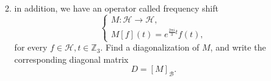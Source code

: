\documentclass{article}
\def\zz{{\mathbb Z}}
\begin{document}
\begin{problem}
\begin{enumerate}[(a)]
\begin{enumerate}[1.]
\begin{equation*}
            \end{equation*}
            \item in addition, we have an operator called frequency shift
            \begin{equation*}
                \begin{cases}
                    M : \mathscr{H} \to \mathscr{H}, \\
                    M[f](t) = e^{\frac{2 \pi i}{3} t} f(t),
                \end{cases}
            \end{equation*}
            for every $f \in \mathscr{H}, t \in \zz_3$. Find a diagonalization of $M$, and write the corresponding diagonal matrix
            \begin{equation*}
                D = [M]_{\mathscr{B}}.
            \end{equation*}
        \end{enumerate}
    \end{enumerate}
\end{problem}
\end{document}
